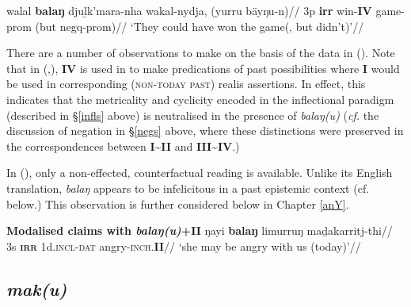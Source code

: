 \a{}\begingl\gla walal \textbf{balaŋ} djuḻk'mara-nha wakal-nydja, (yurru bäyŋu-n)//
\glb 3p \textbf{\gls{irr}} win-\textbf{IV} game-\gls{prom} (but \gls{negq}-\gls{prom})//
\glft`They could have won the game(, but didn't)'\trailingcitation{[FW? 20180802]}//\endgl
{}


\xe

There are a number of observations to make on the basis of the data in (\lastx). Note that in (,), \textbf{IV} is used in to make predications of past possibilities where \textbf{I} would be used in corresponding (\textsc{non-today past}) realis assertions. In  effect, this indicates that the metricality and cyclicity encoded in the inflectional paradigm (described in §\ref{infls} above) is neutralised in the presence of \textit{balaŋ(u)} (\textit{cf.} the discussion of negation in §\ref{negs} above, where these distinctions were preserved in the correspondences between \textbf{I\textasciitilde II} and \textbf{III\textasciitilde IV}.)

In (), only a non-effected, counterfactual reading is available. Unlike its English translation, \textit{balaŋ} appears to be infelicitous in a past epistemic context (cf.  below.) This observation is further considered below in Chapter \ref{anY}.

\pex\textbf{Modalised claims with \textit{balaŋ(u)}+II}
\a{}\begingl
\gla ŋayi \textbf{balaŋ} limurruŋ maḏakarritj-thi//
\glb3s \textbf{\textsc{irr}} 1d\textsc{.incl-dat} angry\textsc{-inch.\textbf{II}}//
\glft`she may be angry with us (today)'//
\endgl
\xe

\subsection*{\textit{mak(u)}}

